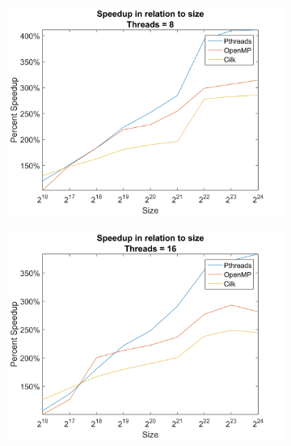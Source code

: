 \documentclass[11pt,a4paper,titlepage]{article}
\begin{document}
\begin{figure}[h!]
\begin{subfigure}[b]{0.45\textwidth}
				\includegraphics[width=\textwidth]{figures/figure-4.3.png}
				\caption{}
			\end{subfigure}
			\begin{subfigure}[b]{0.45\textwidth}
				\includegraphics[width=\textwidth]{figures/figure-4.4.png}
				\caption{}
			\end{subfigure}
		\end{figure}  
\end{document}
